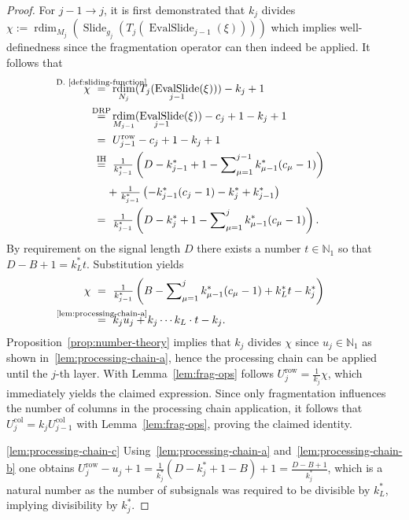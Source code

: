 \documentclass[journal]{IEEEtran}
\newcommand{\N}{\mathbb{N}}
\newcommand{\ROI}{B}
\DeclareMathOperator{\rdim}{rdim}
\DeclareMathOperator{\Slide}{Slide}
\DeclareMathOperator{\EvalSlide}{EvalSlide}
\newcommand{\row}{\operatorname{row}}
\newcommand{\col}{\operatorname{col}}
\newcommand{\equsing}[1]{\overset{\mathclap{\text{#1}}}{=}}
\begin{document}
\begin{proof}
For $j - 1 \to j$, it is first demonstrated that $k_j$ divides ${\chi := \rdim_{M_j}(\Slide_{g_j}(T_j(\EvalSlide_{j - 1}(\xi))))}$ which implies well-definedness since the fragmentation operator can then indeed be applied.
It follows that
\begin{align*}
  \chi\ &\equsing{D.~\ref{def:sliding-function}}\ \rdim_{N_j}(T_j(\EvalSlide_{j - 1}(\xi))) - k_j + 1\\
        &\equsing{DRP}\ \rdim_{M_{j - 1}}(\EvalSlide_{j - 1}(\xi)) - c_j + 1 - k_j + 1\\
        &=\ U_{j - 1}^{\row} - c_j + 1 - k_j + 1\\
        &\equsing{IH}\ \tfrac{1}{k_{j - 1}^*}\left(D - k_{j - 1}^* + 1 - \sum\nolimits_{\mu = 1}^{j - 1} k_{\mu - 1}^*(c_\mu - 1)\right)\\
        &\phantom{\equsing{IH}}\ + \tfrac{1}{k_{j - 1}^*}\left(-k_{j - 1}^*(c_j - 1) - k_j^* + k_{j - 1}^*\right)\\
        &=\ \tfrac{1}{k_{j - 1}^*}\left(D - k_j^* + 1 - \sum\nolimits_{\mu = 1}^j k_{\mu - 1}^*(c_\mu - 1)\right)\text{.}
\end{align*}
By requirement on the signal length $D$ there exists a number $t\in\N_1$ so that $D - \ROI + 1 = k_L^* t$.
Substitution yields
\begin{align*}
  \chi\ &=\ \tfrac{1}{k_{j - 1}^*}\left(\ROI - \sum\nolimits_{\mu = 1}^j k_{\mu - 1}^*(c_\mu - 1) + k_L^* t - k_j^*\right)\\
       &\equsing{\ref{lem:processing-chain-a}}\ k_j u_j + k_j\cdots k_L\cdot t - k_j\text{.}
\end{align*}
Proposition~\ref{prop:number-theory} implies that $k_j$ divides $\chi$ since $u_j\in\N_1$ as shown in~\ref{lem:processing-chain-a}, hence the processing chain can be applied until the $j$-th layer.
With Lemma~\ref{lem:frag-ops} follows $U_j^{\row} = \frac{1}{k_j}\chi$, which immediately yields the claimed expression.
Since only fragmentation influences the number of columns in the processing chain application, it follows that $U_j^{\col} = k_j U_{j - 1}^{\col}$ with Lemma~\ref{lem:frag-ops}, proving the claimed identity.

\ref{lem:processing-chain-c}
Using~\ref{lem:processing-chain-a} and~\ref{lem:processing-chain-b} one obtains $U_j^{\row} - u_j + 1 = \tfrac{1}{k_j^*}\left(D - k_j^* + 1 - \ROI\right) + 1 = \tfrac{D - \ROI + 1}{k_j^*}$,
which is a natural number as the number of subsignals was required to be divisible by $k_L^*$, implying divisibility by $k_j^*$.


\end{proof}
\end{document}
